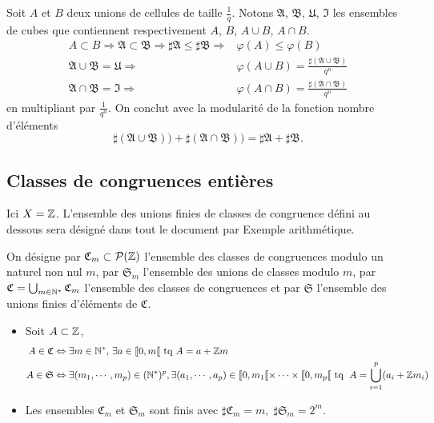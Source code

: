 \begin{demo}
 Soit $A$ et $B$ deux unions de cellules de taille $\frac{1}{q}$. Notons $\mathfrak{A}$, $\mathfrak{B}$, $\mathfrak{U}$, $\mathfrak{I}$ les ensembles de cubes que contiennent respectivement $A$, $B$, $A\cup B$, $A\cap B$.
 \begin{align*}
  A \subset B \Rightarrow \mathfrak{A} \subset \mathfrak{B} \Rightarrow \sharp\mathfrak{A} \leq \sharp \mathfrak{B} \Rightarrow& \varphi(A) \leq \varphi(B) \\
  \mathfrak{A}\cup \mathfrak{B} = \mathfrak{U} \Rightarrow& \varphi(A\cup B) = \frac{\sharp(\mathfrak{A}\cup \mathfrak{B})}{q^n} \\
  \mathfrak{A}\cap \mathfrak{B} = \mathfrak{I} \Rightarrow& \varphi(A\cap B) = \frac{\sharp(\mathfrak{A}\cap \mathfrak{B})}{q^n}
 \end{align*}
 en multipliant par $\frac{1}{q^n}$. On conclut avec la modularité de la fonction nombre d'éléments
 \begin{displaymath}
  \sharp(\mathfrak{A}\cup \mathfrak{B})) + \sharp(\mathfrak{A}\cap \mathfrak{B})) = \sharp\mathfrak{A} + \sharp \mathfrak{B}.
 \end{displaymath}
\end{demo}

\subsection{Classes de congruences entières}\label{SubSec:ClassesCongru}
Ici $X = \mathbb{Z}$. 
L'ensemble des unions finies de classes de congruence défini au dessous sera désigné dans tout le document par \og Exemple arithmétique\fg.

\begin{defi}
On désigne par $\mathfrak{C}_m \subset \mathcal{P}(\mathbb{Z})$ l'ensemble des classes de congruences modulo un naturel non nul $m$, par $\mathfrak{S}_m$ l'ensemble des unions de classes modulo $m$, par $\mathfrak{C} = \bigcup_{m \in \mathbb{N}^*}\mathfrak{C}_m$ l'ensemble des classes de congruences et par $\mathfrak{S}$ l'ensemble des unions finies d'éléments de $\mathfrak{C}$.
\end{defi}
\begin{rems}
 \begin{itemize}
  \item Soit $A \subset \mathbb{Z}$,
  \begin{align*}
 A \in \mathfrak{C}  &\Leftrightarrow \exists m\in \mathbb{N}^*,\, \exists a \in \llbracket 0, m \llbracket \text{ tq } A = a + \mathbb{Z} m \\
 A\in \mathfrak{S} &\Leftrightarrow \exists (m_1,\cdots,m_p) \in (\mathbb{N}^*)^p, \exists (a_1,\cdots,a_p)\in \llbracket 0,m_1\llbracket \times \dots \times \llbracket 0,m_p\llbracket \text{ tq }\;
 A = \bigcup_{i=1}^{p}(a_i + \mathbb{Z} m_i)
  \end{align*}
    \item Les ensembles $\mathfrak{C}_m$ et $\mathfrak{S}_m$ sont finis avec $\sharp \mathfrak{C}_m = m, \; \sharp \mathfrak{S}_m = 2^m$.
  \end{itemize}
\end{rems}

